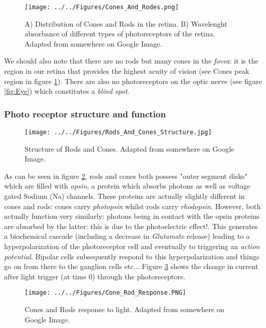\begin{figure}[H]
    \centering
    \texttt{[image: ../../Figures/Cones\_And\_Rodes.png]}
    \caption{A) Distribution of Cones and Rods in the retina. B) Wavelenght absorbance of different types of photoreceptors of the retina. Adapted from somewhere on Google Image.}
    \label{fig:Cones_And_Rodes}
\end{figure}

We should also note that there are no rods but many cones in the \textit{fovea}: it is the region in our retina that provides the highest acuity of vision (see Cones peak region in figure \ref{fig:Cones_And_Rodes}). There are also no photoreceptors on the optic nerve (see figure \ref{fig:Eye}) which constitutes a \textit{blind spot}. 

\subsubsection{Photo receptor structure and function}

\begin{figure}[H]
    \centering
    \texttt{[image: ../../Figures/Rods\_And\_Cones\_Structure.jpg]}
    \caption{Structure of Rods and Cones. Adapted from somewhere on Google Image.}
    \label{fig:Rods_And_Cones_Structure}
\end{figure}

As can be seen in figure \ref{fig:Rods_And_Cones_Structure}, rods and cones both possess "outer segment disks" which are filled with \textit{opsin}, a protein which absorbs photons as well as voltage gated Sodium (Na) channels. These proteins are actually slightly different in cones and rods: cones carry \textit{photopsin} whilst rods carry \textit{rhodopsin}. However, both actually function very similarly: photons being in contact with the opsin proteins are absorbed by the latter: this is due to the photoelectric effect!. This generates a biochemical cascade (including a decrease in \textit{Glutamate} release) leading to a hyperpolarization of the photoreceptor cell and eventually to triggering an \textit{action potential}. Bipolar cells subsequently respond to this hyperpolarization and things go on from there to the ganglion cells etc...
Figure \ref{fig:Cone_Rode_Response} shows the change in current after light trigger (at time 0) through the photoreceptors.  

\begin{figure}[H]
    \centering
    \texttt{[image: ../../Figures/Cone\_Rod\_Response.PNG]}
    \caption{Cones and Rods response to light. Adapted from somewhere on Google Image.}
    \label{fig:Cone_Rode_Response}
\end{figure}

